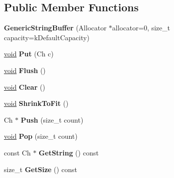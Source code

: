\subsection*{Public Member Functions}
\begin{DoxyCompactItemize}
\item 
\hypertarget{class_generic_string_buffer_a62f5ea1a53a2a3f98088f8c152b6183e}{}{\bfseries Generic\+String\+Buffer} (Allocator $\ast$allocator=0, size\+\_\+t capacity=k\+Default\+Capacity)\label{class_generic_string_buffer_a62f5ea1a53a2a3f98088f8c152b6183e}

\item 
\hypertarget{class_generic_string_buffer_a8be5c8fadccacdcf40e20220f38e0afa}{}\hyperlink{_s_d_l__audio_8h_a52835ae37c4bb905b903cbaf5d04b05f}{void} {\bfseries Put} (Ch c)\label{class_generic_string_buffer_a8be5c8fadccacdcf40e20220f38e0afa}

\item 
\hypertarget{class_generic_string_buffer_a28bb539487db17b07314a532f3b8847c}{}\hyperlink{_s_d_l__audio_8h_a52835ae37c4bb905b903cbaf5d04b05f}{void} {\bfseries Flush} ()\label{class_generic_string_buffer_a28bb539487db17b07314a532f3b8847c}

\item 
\hypertarget{class_generic_string_buffer_a42f15c959046d899cb74c3120a6995f9}{}\hyperlink{_s_d_l__audio_8h_a52835ae37c4bb905b903cbaf5d04b05f}{void} {\bfseries Clear} ()\label{class_generic_string_buffer_a42f15c959046d899cb74c3120a6995f9}

\item 
\hypertarget{class_generic_string_buffer_a0dbdb77489b95923795011a24f705be5}{}\hyperlink{_s_d_l__audio_8h_a52835ae37c4bb905b903cbaf5d04b05f}{void} {\bfseries Shrink\+To\+Fit} ()\label{class_generic_string_buffer_a0dbdb77489b95923795011a24f705be5}

\item 
\hypertarget{class_generic_string_buffer_a49fd10cdd5dd97a4cf9813d01334d660}{}Ch $\ast$ {\bfseries Push} (size\+\_\+t count)\label{class_generic_string_buffer_a49fd10cdd5dd97a4cf9813d01334d660}

\item 
\hypertarget{class_generic_string_buffer_a0038e53ba03c271bc4cbbac403ec4de4}{}\hyperlink{_s_d_l__audio_8h_a52835ae37c4bb905b903cbaf5d04b05f}{void} {\bfseries Pop} (size\+\_\+t count)\label{class_generic_string_buffer_a0038e53ba03c271bc4cbbac403ec4de4}

\item 
\hypertarget{class_generic_string_buffer_a42ed917a29012d932802f2709e11c572}{}const Ch $\ast$ {\bfseries Get\+String} () const \label{class_generic_string_buffer_a42ed917a29012d932802f2709e11c572}

\item 
\hypertarget{class_generic_string_buffer_abd04725d776322157be3381f5559c40b}{}size\+\_\+t {\bfseries Get\+Size} () const \label{class_generic_string_buffer_abd04725d776322157be3381f5559c40b}

\end{DoxyCompactItemize}
